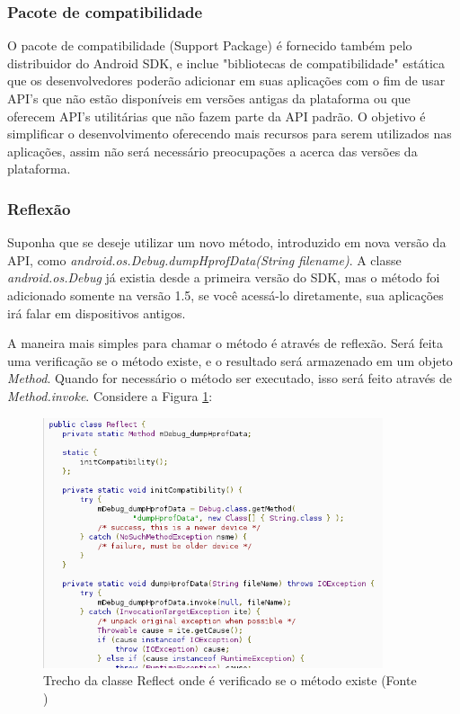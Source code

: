 \subsubsection{Pacote de compatibilidade}

O pacote de compatibilidade (Support Package) é fornecido também pelo distribuidor do 
Android SDK, e inclue "bibliotecas de compatibilidade" estática que os desenvolvedores 
poderão adicionar em suas aplicações com o fim de usar API's que não estão disponíveis 
em versões antigas da plataforma ou que oferecem API's utilitárias que não fazem 
parte da API padrão. O objetivo é simplificar o desenvolvimento oferecendo mais 
recursos para serem utilizados nas aplicações, assim não será necessário preocupações
a acerca das versões da plataforma.

\subsubsection{Reflexão}

Suponha que se deseje utilizar um novo método, introduzido em nova versão da API,
como {\it android.os.Debug.dumpHprofData(String filename)}. A classe {\it android.os.Debug}
já existia desde a primeira versão do SDK, mas o método foi adicionado somente na versão 
1.5, se você acessá-lo diretamente, sua aplicações irá falar em dispositivos antigos.

A maneira mais simples para chamar o método é através de reflexão. Será feita uma 
verificação se o método existe, e o resultado será armazenado em um objeto {\it Method}.
Quando for necessário o método ser executado, isso será feito através de 
{\it Method.invoke}. Considere a Figura \ref{class_reflect1}:

\begin{figure}[h]
    \centering
    \includegraphics[width=10cm]{img/reflect1}
    \caption[Trecho da classe Reflect onde é verificado se o método existe]{Trecho da classe Reflect onde é verificado se o método existe (Fonte \cite{back_compat})}
    \label{class_reflect1}
\end{figure}

